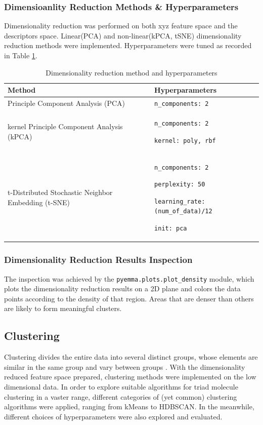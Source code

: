 \documentclass[a4paper]{article}
\begin{document}
\subsubsection{Dimensioanlity Reduction Methods \& Hyperparameters}
Dimensionality reduction was performed on both xyz feature space and the descriptors space. Linear(PCA) and non-linear(kPCA, tSNE) dimensionality reduction methods were implemented. Hyperparameters were tuned as recorded in Table \ref{table: dimreduct}.

\begin{table}[H]
    \centering
    \caption{Dimensionality reduction method and hyperparameters}
    \begin{tabular}{p{}|p{}}
    \hline \hline
        \textbf{Method} & \textbf{Hyperparameters} \\
        \hline
        Principle Component Analysis (PCA) & \texttt{n\_components: 2} \\
        \hline
        kernel Principle Component Analysis (kPCA) & \texttt{n\_components: 2} \par \texttt{kernel: poly, rbf} \\
        \hline
        t-Distributed Stochastic Neighbor Embedding (t-SNE)\cite{KobakDmitry} & \texttt{n\_components: 2} \par \texttt{perplexity: 50} \par \texttt{learning\_rate: (num\_of\_data)/12} \par \texttt{init: pca} \\
        \hline \hline
    \end{tabular}
    \label{table: dimreduct}
\end{table}

\subsubsection{Dimensionality Reduction Results Inspection}
The inspection was achieved by the \texttt{pyemma.plots.plot\_density} module, which plots the dimensionality reduction results on a 2D plane and colors the data points according to the density of that region. Areas that are denser than others are likely to form meaningful clusters.

\subsection{Clustering}
Clustering divides the entire data into several distinct groups, whose elements are similar in the same group and vary between groups \cite{GlielmoAldo}. With the dimensionality reduced feature space prepared, clustering methods were implemented on the low dimensional data.  In order to explore suitable algorithms for triad molecule clustering in a vaster range, different categories of (yet common) clustering algorithms were applied, ranging from kMeans to HDBSCAN. In the meanwhile, different choices of hyperparameters were also explored and evaluated.
\end{document}
